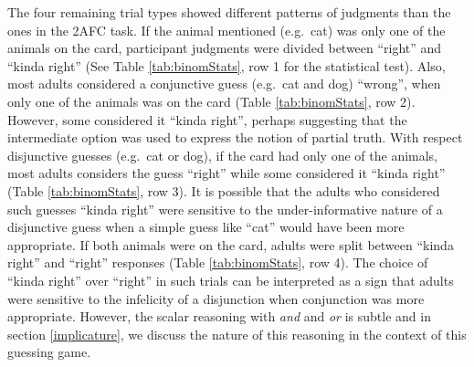 \documentclass[floatsintext,man]{apa6}
\theoremstyle{definition}
\theoremstyle{definition}
\theoremstyle{definition}
\theoremstyle{remark}
\begin{document}
The four remaining trial types showed different patterns of judgments
than the ones in the 2AFC task. If the animal mentioned (e.g.~cat) was
only one of the animals on the card, participant judgments were divided
between \enquote{right} and \enquote{kinda right} (See Table
\ref{tab:binomStats}, row 1 for the statistical test). Also, most adults
considered a conjunctive guess (e.g.~cat and dog) \enquote{wrong}, when
only one of the animals was on the card (Table \ref{tab:binomStats}, row
2). However, some considered it \enquote{kinda right}, perhaps
suggesting that the intermediate option was used to express the notion
of partial truth. With respect disjunctive guesses (e.g.~cat or dog), if
the card had only one of the animals, most adults considers the guess
\enquote{right} while some considered it \enquote{kinda right} (Table
\ref{tab:binomStats}, row 3). It is possible that the adults who
considered such guesses \enquote{kinda right} were sensitive to the
under-informative nature of a disjunctive guess when a simple guess like
\enquote{cat} would have been more appropriate. If both animals were on
the card, adults were split between \enquote{kinda right} and
\enquote{right} responses (Table \ref{tab:binomStats}, row 4). The
choice of \enquote{kinda right} over \enquote{right} in such trials can
be interpreted as a sign that adults were sensitive to the infelicity of
a disjunction when conjunction was more appropriate. However, the scalar
reasoning with \emph{and} and \emph{or} is subtle and in section
\ref{implicature}, we discuss the nature of this reasoning in the
context of this guessing game.
\end{document}
